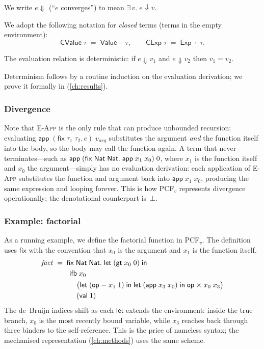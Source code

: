 We write $e \Downarrow$ (``$e$ converges'') to mean $\exists\, v.\;
e \Downarrow v$.

We adopt the following notation for \emph{closed} terms (terms in
the empty environment):
\[
  \mathsf{CValue}\;\tau \;=\; \mathsf{Value}\;\cdot\;\tau,
  \qquad
  \mathsf{CExp}\;\tau \;=\; \mathsf{Exp}\;\cdot\;\tau.
\]

\begin{proposition}[Determinism]
\label{prop:eval-deterministic}
The evaluation relation is deterministic: if $e \Downarrow v_1$ and
$e \Downarrow v_2$ then $v_1 = v_2$.
\end{proposition}

Determinism follows by a routine induction on the evaluation derivation;
we prove it formally in \Rocq{} (\cref{ch:results}).

\subsubsection*{Divergence}

Note that \textsc{E-App} is the only rule that can produce unbounded
recursion: evaluating $\mathsf{app}\;(\mathsf{fix}\;\tau_1\;\tau_2.\,e)
\;v_{\mathit{arg}}$ substitutes the argument \emph{and} the function
itself into the body, so the body may call the function again.  A term
that never terminates---such as
$\mathsf{app}\;(\mathsf{fix}\;\mathsf{Nat}\;\mathsf{Nat}.\;\mathsf{app}\;x_1\;x_0)\;0$,
where $x_1$ is the function itself and $x_0$ the argument---simply has
no evaluation derivation: each application of \textsc{E-App} substitutes
the function and argument back into $\mathsf{app}\;x_1\;x_0$, producing
the same expression and looping forever.  This is how PCF$_v$ represents
divergence operationally; the denotational counterpart is~$\bot$.

\subsubsection*{Example: factorial}

As a running example, we define the factorial function in PCF$_v$.
The definition uses $\mathsf{fix}$ with the convention that $x_0$ is
the argument and $x_1$ is the function itself.
\begin{align*}
  \mathit{fact} \;&=\; \mathsf{fix}\;\mathsf{Nat}\;\mathsf{Nat}.\;
    \mathsf{let}\; (\mathsf{gt}\;x_0\;0) \;\mathsf{in} \\
    &\qquad \mathsf{ifb}\;x_0 \\
    &\qquad\quad
      \bigl(\mathsf{let}\;(\mathsf{op}\;{-}\;x_1\;1)\;\mathsf{in}\;
            \mathsf{let}\;(\mathsf{app}\;x_3\;x_0)\;\mathsf{in}\;
            \mathsf{op}\;{\times}\;x_0\;x_3\bigr) \\
    &\qquad\quad (\mathsf{val}\;1)
\end{align*}
The de~Bruijn indices shift as each $\mathsf{let}$ extends the
environment: inside the true branch, $x_0$ is the most recently bound
variable, while $x_3$ reaches back through three binders to the
self-reference.  This is the price of nameless syntax; the mechanised
representation (\cref{ch:methods}) uses the same scheme.

